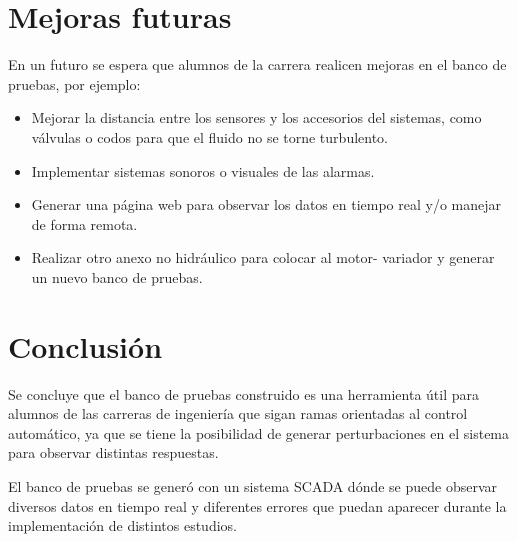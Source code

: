 
\newpage
\section{Mejoras futuras}
En un futuro se espera que alumnos de la carrera realicen mejoras en el banco de pruebas, por ejemplo:
\begin{itemize}
	\item Mejorar la distancia entre los sensores y los accesorios del sistemas, como válvulas o codos para que el fluido no se torne turbulento.
	\item Implementar sistemas sonoros o visuales de las alarmas.
	\item Generar una página web para observar los datos en tiempo real y/o manejar de forma remota.
	\item Realizar otro anexo no hidráulico para colocar al motor- variador y generar un nuevo banco de pruebas.
\end{itemize}

\newpage
\section{Conclusión}
Se concluye que el banco de pruebas construido es una herramienta útil para alumnos de las carreras de ingeniería que sigan ramas orientadas al control automático, ya que se tiene la posibilidad de generar perturbaciones en el sistema para observar distintas respuestas.

El banco de pruebas se generó con un sistema SCADA dónde se puede observar diversos datos en tiempo real y diferentes errores que puedan aparecer durante la implementación de distintos estudios.



\newpage